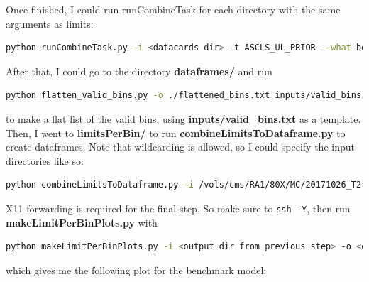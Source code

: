 Once finished, I could run runCombineTask for each directory with the same arguments as limits:

\begin{lstlisting}[belowskip=-0.7cm, language=sh, numbers=none]
python runCombineTask.py -i <datacards dir> -t ASCLS_UL_PRIOR --what both
\end{lstlisting}

After that, I could go to the directory \textbf{dataframes/} and run

\begin{lstlisting}[belowskip=-0.7cm, language=sh, numbers=none]
python flatten_valid_bins.py -o ./flattened_bins.txt inputs/valid_bins.txt 
\end{lstlisting}

to make a flat list of the valid bins, using \textbf{inputs/valid\_bins.txt} as a template. Then, I went to \textbf{limitsPerBin/} to run \textbf{combineLimitsToDataframe.py} to create dataframes. Note that wildcarding is allowed, so I could specify the input directories like so:

\begin{lstlisting}[belowskip=-0.7cm, language=sh, numbers=none]
python combineLimitsToDataframe.py -i /vols/cms/RA1/80X/MC/20171026_T2tt_4bd/AlphaStats_Benchmark_* -o <output dir> --valid-bins ../flattened_bins.txt
\end{lstlisting}

X11 forwarding is required for the final step. So make sure to \texttt{ssh -Y}, then run \textbf{makeLimitPerBinPlots.py} with

\begin{lstlisting}[belowskip=-0.7cm, language=sh, numbers=none]
python makeLimitPerBinPlots.py -i <output dir from previous step> -o <output dir for plots>
\end{lstlisting}

which gives me the following plot for the benchmark model:

